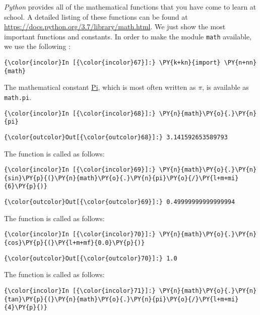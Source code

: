 \textsl{Python} provides all of the mathematical functions that you have
come to learn at school. A detailed listing of these functions can be
found at
\href{https://docs.python.org/3.7/library/math.html}{https://docs.python.org/3.7/library/math.html}. We just
show the most important functions and constants. In order to make the module \texttt{math}
available, we use the following : 

\begin{Verbatim}[commandchars=\\\{\}]
{\color{incolor}In [{\color{incolor}67}]:} \PY{k+kn}{import} \PY{n+nn}{math}
\end{Verbatim}
The mathematical constant \href{https://en.wikipedia.org/wiki/Pi}{Pi}, which is most often written as \(\pi\), is
available as \texttt{math.pi}.

\begin{Verbatim}[commandchars=\\\{\}]
{\color{incolor}In [{\color{incolor}68}]:} \PY{n}{math}\PY{o}{.}\PY{n}{pi}
\end{Verbatim}

\begin{Verbatim}[commandchars=\\\{\}]
{\color{outcolor}Out[{\color{outcolor}68}]:} 3.141592653589793
\end{Verbatim}
The  function is called as follows:
\begin{Verbatim}[commandchars=\\\{\}]
{\color{incolor}In [{\color{incolor}69}]:} \PY{n}{math}\PY{o}{.}\PY{n}{sin}\PY{p}{(}\PY{n}{math}\PY{o}{.}\PY{n}{pi}\PY{o}{/}\PY{l+m+mi}{6}\PY{p}{)}
\end{Verbatim}

\begin{Verbatim}[commandchars=\\\{\}]
{\color{outcolor}Out[{\color{outcolor}69}]:} 0.49999999999999994
\end{Verbatim}           
The  function is called as follows: 
\begin{Verbatim}[commandchars=\\\{\}]
{\color{incolor}In [{\color{incolor}70}]:} \PY{n}{math}\PY{o}{.}\PY{n}{cos}\PY{p}{(}\PY{l+m+mf}{0.0}\PY{p}{)}
\end{Verbatim}


\begin{Verbatim}[commandchars=\\\{\}]
{\color{outcolor}Out[{\color{outcolor}70}]:} 1.0
\end{Verbatim}
The  function is called as follows:
\begin{Verbatim}[commandchars=\\\{\}]
{\color{incolor}In [{\color{incolor}71}]:} \PY{n}{math}\PY{o}{.}\PY{n}{tan}\PY{p}{(}\PY{n}{math}\PY{o}{.}\PY{n}{pi}\PY{o}{/}\PY{l+m+mi}{4}\PY{p}{)}
\end{Verbatim}

